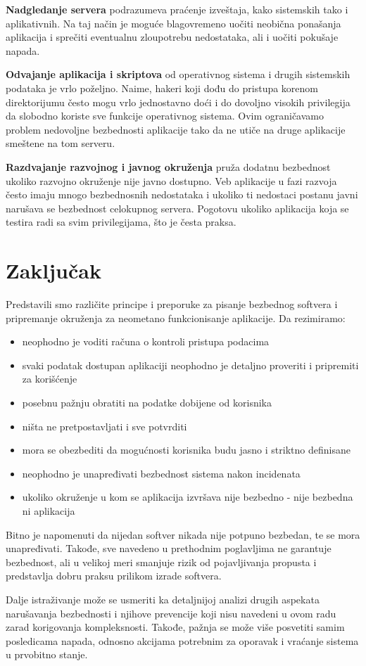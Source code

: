 \documentclass[a4paper]{article}
\begin{document}
\textbf{Nadgledanje servera} podrazumeva praćenje izveštaja, kako sistemskih tako i aplikativnih. Na taj način je moguće blagovremeno uočiti neobična ponašanja aplikacija i sprečiti eventualnu zloupotrebu nedostataka, ali i uočiti pokušaje napada.

\textbf{Odvajanje aplikacija i skriptova} od operativnog sistema i drugih sistemskih podataka je vrlo poželjno. Naime, hakeri koji dođu do pristupa korenom direktorijumu često mogu vrlo jednostavno doći i do dovoljno visokih privilegija da slobodno koriste sve funkcije operativnog sistema. Ovim ograničavamo problem nedovoljne bezbednosti aplikacije tako da ne utiče na druge aplikacije smeštene na tom serveru.

\textbf{Razdvajanje razvojnog i javnog okruženja} pruža dodatnu bezbednost ukoliko razvojno okruženje nije javno dostupno. Veb aplikacije u fazi razvoja često imaju mnogo bezbednosnih nedostataka i ukoliko ti nedostaci postanu javni narušava se bezbednost celokupnog servera. Pogotovu ukoliko aplikacija koja se testira radi sa svim privilegijama, što je česta praksa.

\section{Zaključak} \label{zakljucak}

Predstavili smo različite principe i preporuke za pisanje bezbednog softvera i pripremanje okruženja za neometano funkcionisanje aplikacije. Da rezimiramo:
\begin{itemize}
	\item neophodno je voditi računa o kontroli pristupa podacima
	\item svaki podatak dostupan aplikaciji neophodno je detaljno proveriti i pripremiti za korišćenje
	\item posebnu pažnju obratiti na podatke dobijene od korisnika
	\item ništa ne pretpostavljati i sve potvrditi
	\item mora se obezbediti da mogućnosti korisnika budu jasno i striktno definisane
	\item neophodno je unapređivati bezbednost sistema nakon incidenata
	\item ukoliko okruženje u kom se aplikacija izvršava nije bezbedno - nije bezbedna ni aplikacija
\end{itemize}

Bitno je napomenuti da nijedan softver nikada nije potpuno bezbedan, te se mora unapređivati. Takođe, sve navedeno u prethodnim poglavljima ne garantuje bezbednost, ali u velikoj meri smanjuje rizik od pojavljivanja propusta i predstavlja dobru praksu prilikom izrade softvera.

Dalje istraživanje može se usmeriti ka detaljnijoj analizi drugih aspekata narušavanja bezbednosti i njihove prevencije koji nisu navedeni u ovom radu zarad korigovanja kompleksnosti. Takođe, pažnja se može više posvetiti samim posledicama napada, odnosno akcijama potrebnim za oporavak i vraćanje sistema u prvobitno stanje.

\nocite{*}
\appendix
{}


\end{document}
